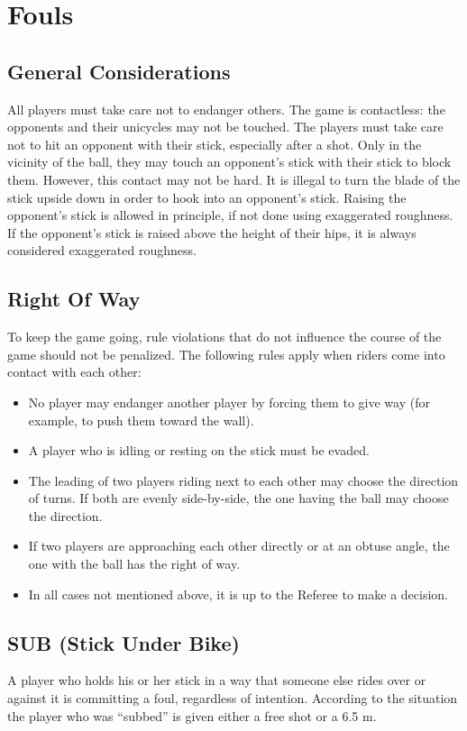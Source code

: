 \section{Fouls}

\subsection{General Considerations}
All players must take care not to endanger others.
The game is contactless: the opponents and their unicycles may not be touched.
The players must take care not to hit an opponent with their stick, especially after a shot.
Only in the vicinity of the ball, they may touch an opponent's stick with their stick to block them.
However, this contact may not be hard.
It is illegal to turn the blade of the stick upside down in order to hook into an opponent's stick.
Raising the opponent's stick is allowed in principle, if not done using exaggerated roughness.
If the opponent's stick is raised above the height of their hips, it is always considered exaggerated roughness.

\subsection{Right Of Way}
To keep the game going, rule violations that do not influence the course of the game should not be penalized.
The following rules apply when riders come into contact with each other:
\begin{itemize}
\item No player may endanger another player by forcing them to give way (for example, to push them toward the wall).
\item A player who is idling or resting on the stick must be evaded.
\item The leading of two players riding next to each other may choose the direction of turns. If both are evenly side-by-side, the one having the ball may choose the direction.
\item If two players are approaching each other directly or at an obtuse angle, the one with the ball has the right of way.
\item In all cases not mentioned above, it is up to the Referee to make a decision.
\end{itemize}

\subsection{SUB (Stick Under Bike)}
A player who holds his or her stick in a way that someone else rides over or against it is committing a foul, regardless of intention.
According to the situation the player who was ``subbed'' is given either a free shot or a 6.5 m.

